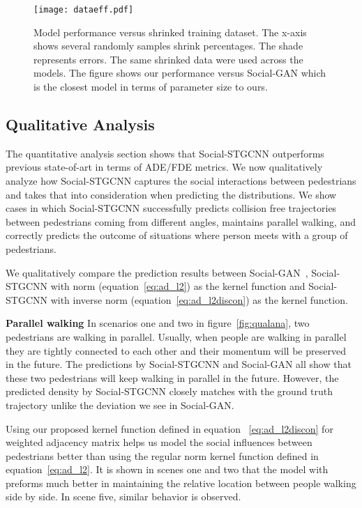 \documentclass[10pt,twocolumn,letterpaper]{article}
\newcommand*{\ours}{Social-STGCNN }
\begin{document}
\begin{figure}[ht]
\begin{center}
\texttt{[image: dataeff.pdf]}
   \caption{Model performance versus shrinked training dataset. The x-axis shows several randomly samples shrink percentages. The shade represents errors. The same shrinked data were used across the models. The figure shows our performance versus Social-GAN which is the closest model in terms of parameter size to ours.}
\end{center}

\label{fig:dataeff}
\end{figure}


\subsection{Qualitative Analysis}


The quantitative analysis section shows that \ours outperforms previous state-of-art in terms of ADE/FDE metrics. We now qualitatively analyze how \ours captures the social interactions between pedestrians and takes that into consideration when predicting the distributions. We show cases in which \ours successfully predicts collision free trajectories between pedestrians coming from different angles, maintains parallel walking, and correctly predicts the outcome of situations where person meets with a group of pedestrians. 

We qualitatively compare the prediction results between Social-GAN~\cite{gupta2018social}, \ours with  norm (equation~\ref{eq:ad_l2}) as the kernel function and \ours with inverse  norm (equation~\ref{eq:ad_l2discon}) as the kernel function.

\noindent
\textbf{Parallel walking } In scenarios one and two in figure~\ref{fig:qualana}, two pedestrians are walking in parallel. Usually, when people are walking in parallel they are tightly connected to each other and their momentum will be preserved in the future. The predictions by \ours and Social-GAN all show that these two pedestrians will keep walking in parallel in the future. However, the predicted density by \ours closely matches with the ground truth trajectory unlike the deviation we see in Social-GAN.

Using our proposed kernel function  defined in equation ~\ref{eq:ad_l2discon} for weighted adjacency matrix helps us model the social influences between pedestrians better than using the regular  norm kernel function defined in equation~\ref{eq:ad_l2}. It is shown in scenes one and two that the model with  preforms much better in maintaining the relative location between people walking side by side. In scene five, similar behavior is observed.
\end{document}
